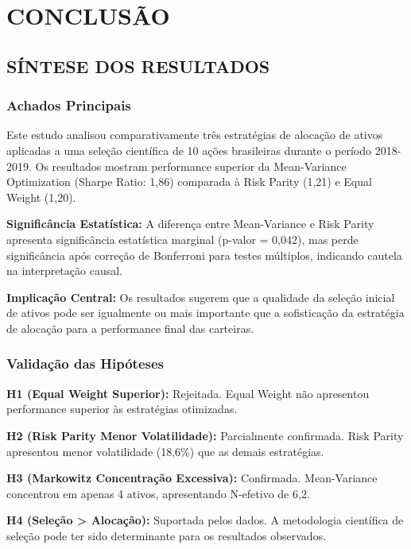 
\chapter{CONCLUSÃO}

\section{SÍNTESE DOS RESULTADOS}

\subsection{Achados Principais}

Este estudo analisou comparativamente três estratégias de alocação de ativos aplicadas a uma seleção científica de 10 ações brasileiras durante o período 2018-2019. Os resultados mostram performance superior da Mean-Variance Optimization (Sharpe Ratio: 1,86) comparada à Risk Parity (1,21) e Equal Weight (1,20).

\textbf{Significância Estatística:} A diferença entre Mean-Variance e Risk Parity apresenta significância estatística marginal (p-valor = 0,042), mas perde significância após correção de Bonferroni para testes múltiplos, indicando cautela na interpretação causal.

\textbf{Implicação Central:} Os resultados sugerem que a qualidade da seleção inicial de ativos pode ser igualmente ou mais importante que a sofisticação da estratégia de alocação para a performance final das carteiras.

\subsection{Validação das Hipóteses}

\textbf{H1 (Equal Weight Superior):} Rejeitada. Equal Weight não apresentou performance superior às estratégias otimizadas.

\textbf{H2 (Risk Parity Menor Volatilidade):} Parcialmente confirmada. Risk Parity apresentou menor volatilidade (18,6\%) que as demais estratégias.

\textbf{H3 (Markowitz Concentração Excessiva):} Confirmada. Mean-Variance concentrou em apenas 4 ativos, apresentando N-efetivo de 6,2.

\textbf{H4 (Seleção > Alocação):} Suportada pelos dados. A metodologia científica de seleção pode ter sido determinante para os resultados observados.

